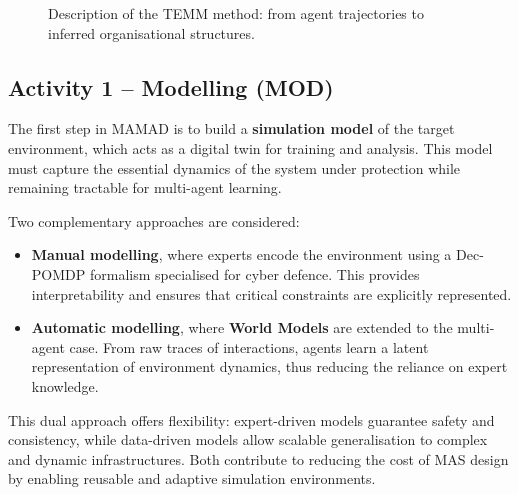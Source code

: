 \documentclass[a4paper,10pt,twocolumn]{article}
\begin{document}
\begin{figure}[h!]
    \centering
    \caption{Description of the TEMM method: from agent trajectories to inferred organisational structures.}
    \label{fig:mm_synthesis}
\end{figure}

\subsection*{Activity 1 – Modelling (MOD)}

The first step in MAMAD is to build a \textbf{simulation model} of the
target environment, which acts as a digital twin for training and
analysis. This model must capture the essential dynamics of the system
under protection while remaining tractable for multi-agent learning.

Two complementary approaches are considered:
\begin{itemize}
    \item \textbf{Manual modelling}, where experts encode the environment
          using a Dec-POMDP formalism specialised for cyber defence. This
          provides interpretability and ensures that critical constraints are
          explicitly represented.
    \item \textbf{Automatic modelling}, where \textbf{World Models} are
          extended to the multi-agent case. From raw traces of interactions,
          agents learn a latent representation of environment dynamics, thus
          reducing the reliance on expert knowledge.
\end{itemize}

This dual approach offers flexibility: expert-driven models guarantee
safety and consistency, while data-driven models allow scalable
generalisation to complex and dynamic infrastructures. Both contribute
to reducing the cost of MAS design by enabling reusable and adaptive
simulation environments.
\end{document}

